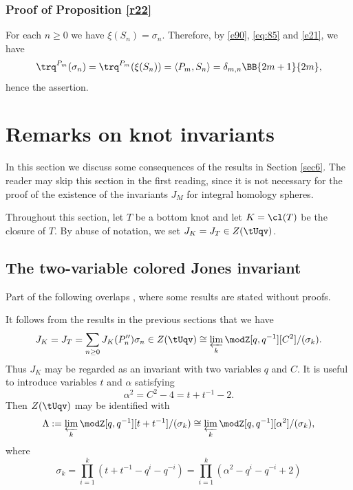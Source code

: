 \documentclass{amsart}
\numberwithin{equation}{section}
\numberwithin{figure}{section}
\theoremstyle{plain}
\theoremstyle{definition}
\theoremstyle{remark}
\begin{document}
\subsubsection{Proof of Proposition \ref{r22}}
\label{sec:proof-prop-refr22-1}

For each $n\ge 0$ we have $\xi (S_n) = \sigma _n$.  Therefore, by \eqref{e90}, \eqref{eq:85}
and \eqref{e21}, we have
\begin{equation*}
  \trq^{P_m}(\sigma _n)
  =\trq^{P_m}(\xi (S_n))
  =\langle P_m,S_n\rangle 
  =\delta _{m,n}\BB{2m+1}{2m},
  \end{equation*}
hence the assertion.

\section{Remarks on knot invariants}
\label{sec7}

In this section we discuss some consequences of the results in Section
\ref{sec6}.  The reader may skip this section in the first
reading, since it is not necessary for the proof of the existence of
the invariants $J_M$ for integral homology spheres.

Throughout this section, let $T$ be a bottom knot and let $K=\cl(T)$
be the closure of $T$.  By abuse of notation, we set
$J_K=J_T\in Z(\tUqv)$.

\subsection{The two-variable colored Jones invariant}
\label{sec:color-jones-polyn-2}

Part of the following overlaps \cite[Section 3.3]{H:rims2001}, where
some results are stated without proofs.

It follows from the results in the previous sections that we have
\begin{equation*}
  J_K=J_T=\sum_{n\ge 0}J_K(P''_n)\sigma _n\in Z(\tUqv)
  \cong\varprojlim_{k}\modZ [q,q^{-1}][C^2]/(\sigma _k).
\end{equation*}
Thus $J_K$ may be regarded as an invariant with two variables $q$ and
$C$.  It is useful to introduce variables $t$ and $\alpha $ satisfying
\begin{equation*}
  \alpha ^2=C^2-4=t+t^{-1}-2.
\end{equation*}
Then $Z(\tUqv)$ may be identified with
\begin{equation*}
  \Lambda := \varprojlim_{k}\modZ [q,q^{-1}][t+t^{-1}]/(\sigma _k) \cong
  \varprojlim_{k}\modZ [q,q^{-1}][\alpha ^2]/(\sigma _k),
\end{equation*}
where
\begin{equation*}
  \sigma _k
  =\prod_{i=1}^k(t+t^{-1}-q^i-q^{-i})
  =\prod_{i=1}^k(\alpha ^2-q^i-q^{-i}+2)
\end{equation*}
\end{document}
